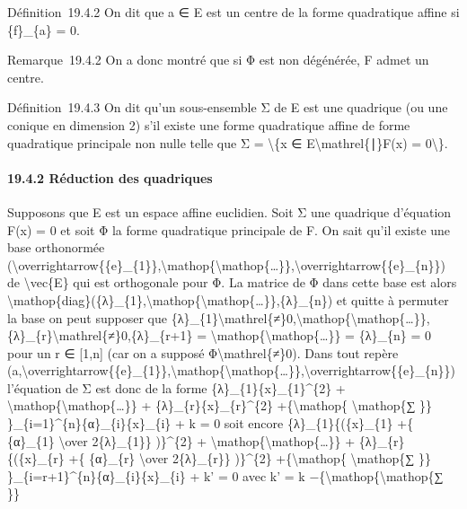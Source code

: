 \documentclass[]{article}
\begin{document}
Définition~19.4.2 On dit que a ∈ E est un centre de la forme quadratique
affine si \{f\}\_\{a\} = 0.

Remarque~19.4.2 On a donc montré que si Φ est non dégénérée, F admet un
centre.

Définition~19.4.3 On dit qu'un sous-ensemble Σ de E est une quadrique
(ou une conique en dimension 2) s'il existe une forme quadratique affine
de forme quadratique principale non nulle telle que Σ =
\textbackslash{}\{x ∈ E\textbackslash{}mathrel\{∣\}F(x) =
0\textbackslash{}\}.

\paragraph{19.4.2 Réduction des quadriques}

Supposons que E est un espace affine euclidien. Soit Σ une quadrique
d'équation F(x) = 0 et soit Φ la forme quadratique principale de F. On
sait qu'il existe une base orthonormée
(\textbackslash{}overrightarrow\{\{e\}\_\{1\}\},\textbackslash{}mathop\{\textbackslash{}mathop\{\ldots{}\}\},\textbackslash{}overrightarrow\{\{e\}\_\{n\}\})
de \textbackslash{}vec\{E\} qui est orthogonale pour Φ. La matrice de Φ
dans cette base est alors
\textbackslash{}mathop\{diag\}(\{λ\}\_\{1\},\textbackslash{}mathop\{\textbackslash{}mathop\{\ldots{}\}\},\{λ\}\_\{n\})
et quitte à permuter la base on peut supposer que
\{λ\}\_\{1\}\textbackslash{}mathrel\{≠\}0,\textbackslash{}mathop\{\textbackslash{}mathop\{\ldots{}\}\},\{λ\}\_\{r\}\textbackslash{}mathrel\{≠\}0,\{λ\}\_\{r+1\}
= \textbackslash{}mathop\{\textbackslash{}mathop\{\ldots{}\}\} =
\{λ\}\_\{n\} = 0 pour un r ∈ {[}1,n{]} (car on a supposé
Φ\textbackslash{}mathrel\{≠\}0). Dans tout repère
(a,\textbackslash{}overrightarrow\{\{e\}\_\{1\}\},\textbackslash{}mathop\{\textbackslash{}mathop\{\ldots{}\}\},\textbackslash{}overrightarrow\{\{e\}\_\{n\}\})
l'équation de Σ est donc de la forme \{λ\}\_\{1\}\{x\}\_\{1\}\^{}\{2\} +
\textbackslash{}mathop\{\textbackslash{}mathop\{\ldots{}\}\} +
\{λ\}\_\{r\}\{x\}\_\{r\}\^{}\{2\} +\{\textbackslash{}mathop\{
\textbackslash{}mathop\{∑ \}\}
\}\_\{i=1\}\^{}\{n\}\{α\}\_\{i\}\{x\}\_\{i\} + k = 0 soit encore
\{λ\}\_\{1\}\{(\{x\}\_\{1\} +\{ \{α\}\_\{1\} \textbackslash{}over
2\{λ\}\_\{1\}\} )\}\^{}\{2\} +
\textbackslash{}mathop\{\textbackslash{}mathop\{\ldots{}\}\} +
\{λ\}\_\{r\}\{(\{x\}\_\{r\} +\{ \{α\}\_\{r\} \textbackslash{}over
2\{λ\}\_\{r\}\} )\}\^{}\{2\} +\{\textbackslash{}mathop\{
\textbackslash{}mathop\{∑ \}\}
\}\_\{i=r+1\}\^{}\{n\}\{α\}\_\{i\}\{x\}\_\{i\} + k' = 0 avec k' = k
−\{\textbackslash{}mathop\{\textbackslash{}mathop\{∑ \}\}
\end{document}
